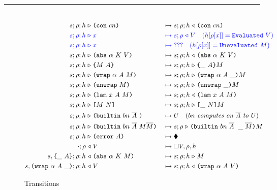 \begin{figure*}[!ht]
\vspace{2mm}
\hrule
\vspace{2.5mm}

\begin{subfigure}[c]{\linewidth}   %
{
\small
\caption{Transitions}
\begin{alignat*}{2}\\
      s;\rho;h  &\compute  \con{cn}               &{}\mapsto{}& s;\rho;h \return \con{cn}\\
      \blue{s; \rho; h} &\bcompute \blue{x}       &{}\bmapsto{}& \blue{s;\rho \return V \quad (h[\rho[x]] = \texttt{Evaluated}\ V)}\\  %
      \blue{s; \rho; h} &\bcompute \blue{x}       &{}\bmapsto{}& \blue{??? \quad (h[\rho[x]] = \texttt{Unevaluated}\ M)}\\  %
      s;\rho;h  &\compute \abs{\alpha}{K}{V}      &{}\mapsto{}& s;\rho;h \return \abs{\alpha}{K}{V}\\
      s;\rho;h &\compute \inst{M}{A}              &{}\mapsto{}& s;\rho;h \compute \inInstLeftFrame{A}{M}\\
      s;\rho;h &\compute \wrap{\alpha}{A}{M}      &{}\mapsto{}& s;\rho;h \compute \inWrapRightFrame{\alpha}{A}{M}\\
      s;\rho;h &\compute \unwrap{M}               &{}\mapsto{}& s;\rho;h \compute \inUnwrapFrame{}{M}\\
      s;\rho;h &\compute \lam{x}{A}{M}            &{}\mapsto{}& s;\rho;h \return \lam{x}{A}{M}\\
      s;\rho;h &\compute \app{M}{N}               &{}\mapsto{}& s;\rho;h \compute \inAppLeftFrame{N}{M}\\
      s;\rho;h &\compute \builtin{bn}{\repetition{A}}{} &{}\mapsto{}& U \quad (\textit{$bn$ computes on $\repetition{A}$ to $U$})\\
      s;\rho;h &\compute \builtin{bn}{\repetition{A}}{M \repetition{M}} &{}\mapsto{}& s;\rho \compute \inBuiltin{bn}{\repetition{A}}{}{\_}{\repetition{M}}{M}\\
      s; \rho;h &\compute \error{A} &{}\mapsto{}& \ckerror{}\\
      \cdot; \rho &\return V &{}\mapsto{}& \square V, \rho, h\\
      s,\inInstLeftFrame{A}; \rho;h &\return \abs{\alpha}{K}{M} &{}\mapsto{}& s;\rho;h \compute{M} \\
      s,\inWrapRightFrame{\alpha}{A}; \rho;h &\return V &{}\mapsto{}& s;\rho;h \return \wrap{\alpha}{A}{V}\\

\end{alignat*}}
\end{subfigure}
\end{figure*}
